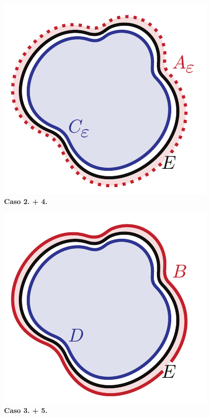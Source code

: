 \begin{theorema}
\begin{enumerate}
\begin{minipage}{0.4\textwidth}
\begin{center}
		\includegraphics[trim=0cm 0cm 0cm 0cm, clip, scale=0.7]{images/regolarita1}\\
		\textbf{Caso 2. + 4.}
	\end{center}
\end{minipage}
\begin{minipage}{0.5\textwidth}
	\begin{center}
			\includegraphics[trim=0cm 0cm 0cm 0cm, clip, scale=0.7]{images/regolarita2}\\
			\textbf{Caso 3. + 5.}
	\end{center}
\end{minipage}
	\end{enumerate}
\end{theorema}
